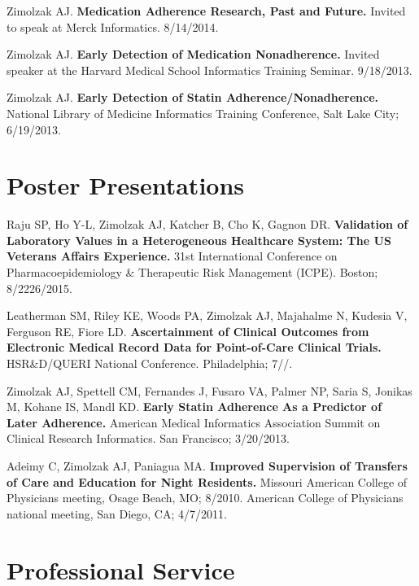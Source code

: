\documentclass[12pt]{article}
\begin{document}
Zimolzak AJ. \textbf{Medication Adherence Research, Past and Future.}
Invited to speak at Merck Informatics. 8/14/2014.

Zimolzak AJ. \textbf{Early Detection of Medication Nonadherence.}
Invited speaker at the Harvard Medical School Informatics Training
Seminar. 9/18/2013.

Zimolzak AJ. \textbf{Early Detection of Statin
  Adherence/Nonadherence.} National Library of Medicine Informatics
Training Conference, Salt Lake City; 6/19/2013.

\section*{Poster Presentations}

Raju SP, Ho Y-L, Zimolzak AJ, Katcher B, Cho K, Gagnon DR.
\textbf{Validation of Laboratory Values in a Heterogeneous Healthcare
  System: The US Veterans Affairs Experience.} 31st International
Conference on Pharmacoepidemiology \& Therapeutic Risk Management
(ICPE). Boston; 8/22\ndash{}26/2015.

Leatherman SM, Riley KE, Woods PA, Zimolzak AJ, Majahalme N, Kudesia
V, Ferguson RE, Fiore LD. \textbf{Ascertainment of Clinical Outcomes
  from Electronic Medical Record Data for Point-of-Care Clinical
  Trials.} HSR\&D/QUERI National Conference. Philadelphia;
7/\ndash{}/.

Zimolzak AJ, Spettell CM, Fernandes J, Fusaro VA, Palmer NP, Saria S,
Jonikas M, Kohane IS, Mandl KD. \textbf{Early Statin Adherence As a
  Predictor of Later Adherence.} American Medical Informatics
Association Summit on Clinical Research Informatics. San Francisco;
3/20/2013.

Adeimy C, Zimolzak AJ, Paniagua MA. \textbf{Improved Supervision of
  Transfers of Care and Education for Night Residents.} Missouri
American College of Physicians meeting, Osage Beach, MO; 8/2010.
American College of Physicians national meeting, San Diego, CA;
4/7/2011.

\section*{Professional Service}
\end{document}

